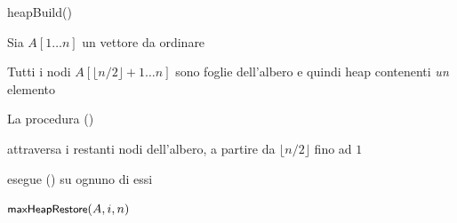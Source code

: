 \begin{frame}{heapBuild()}

\BIL
\item Sia $A[1 \ldots n]$ un vettore da ordinare
\item Tutti i nodi $A[\lfloor n/2 \rfloor+1 \ldots n]$ sono foglie dell'albero e quindi heap contenenti \emph{un} elemento
\item La procedura \heapbuild() 
  \BI
  \item attraversa i restanti nodi dell'albero, a partire da $\lfloor n/2 \rfloor$ fino ad $1$
  \item esegue \maxheapify() su ognuno di essi
  \EI
\EIL

\bigskip
\begin{Procedure}
\caption[A]{\heapbuild($\Item[\,]\ A$, \INTEGER $n$)}
\label{alg:heapbuild}

{
  $\textsf{{\small maxHeapRestore}}(A, i, n)$\;
}
\end{Procedure}

\end{frame}

